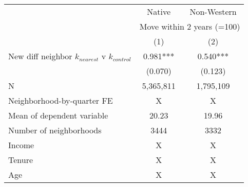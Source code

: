 \begin{tabular}{lcc}
\toprule
 & Native & Non-Western \\ 
\cmidrule(lr){2-2} \cmidrule(lr){3-3}
 & \multicolumn{2}{c}{Move within 2 years (=100)} \\ 
\cmidrule(lr){2-3}
  & (1) & (2) \\ 
\midrule
New diff neighbor $k_{nearest}$ v $k_{control}$ & 0.981*** & 0.540*** \\ 
 & (0.070) & (0.123) \\ 
 \midrule
N & 5,365,811 & 1,795,109 \\ 
Neighborhood-by-quarter FE & X & X \\ 
Mean of dependent variable & 20.23 & 19.96 \\ 
Number of neighborhoods & 3444 & 3332 \\ 
Income & X & X \\ 
Tenure & X & X \\ 
Age & X & X \\ 
\bottomrule
\end{tabular}